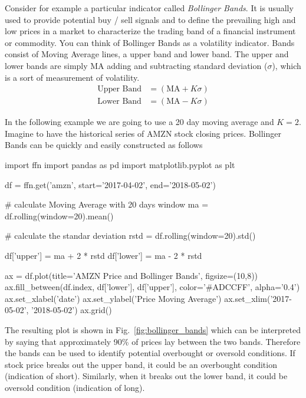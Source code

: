 \begin{ipython}
Consider for example a particular indicator called \emph{Bollinger Bands}. It is usually used to provide potential buy / sell signals and to define the prevailing high and low prices in a market to characterize the trading band of a financial instrument or commodity. You can think of Bollinger Bands as a volatility indicator. Bands consist of Moving Average lines, a upper band and lower band. The upper and lower bands are simply MA adding and subtracting standard deviation ($\sigma$), which is a sort of  measurement of volatility. 
\[
\begin{split}
\textrm{Upper Band} & = (\textrm{MA} + K\sigma)\\
\textrm{Lower Band} & = (\textrm{MA} − K\sigma)
\end{split}
\]

In the following example we are going to use a 20 day moving average and $K=2$. Imagine to have the historical series of AMZN stock closing prices. Bollinger Bands can be quickly and easily constructed as follows 

\begin{ipython}
import ffn
import pandas as pd
import matplotlib.pyplot as plt

df = ffn.get('amzn', start='2017-04-02', end='2018-05-02')

# calculate Moving Average with 20 days window
ma = df.rolling(window=20).mean()

# calculate the standar deviation
rstd = df.rolling(window=20).std()

df['upper'] = ma + 2 * rstd
df['lower'] = ma - 2 * rstd

ax = df.plot(title='AMZN Price and Bollinger Bands', figsize=(10,8))
ax.fill_between(df.index, df['lower'], df['upper'], color='#ADCCFF', alpha='0.4')
ax.set_xlabel('date')
ax.set_ylabel('Price Moving Average')
ax.set_xlim('2017-05-02', '2018-05-02')
ax.grid()
\end{ipython}

The resulting plot is shown in Fig.~\ref{fig:bollinger_bands} which can be interpreted by saying that approximately 90\% of prices lay between the two bands. Therefore the bands can be used to identify potential overbought or oversold conditions. If stock price breaks out the upper band, it could be an overbought condition (indication of short). Similarly, when it breaks out the lower band, it could be oversold condition (indication of long). 


\end{ipython}
